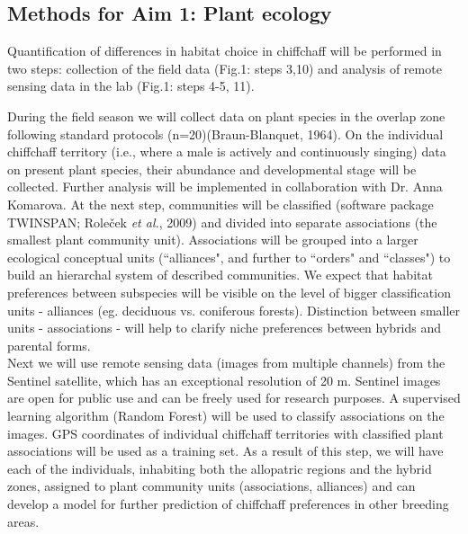\documentclass[11pt,a4paper]{article}
\begin{document}
\subsection{Methods for Aim 1: Plant ecology} 

Quantification of differences in habitat choice in chiffchaff will be performed in two steps: collection of the field data (Fig.1: steps 3,10) and analysis of remote sensing data in the lab (Fig.1: steps 4-5, 11).

During the field season we will collect data on plant species in the overlap zone following standard protocols (n=20)(Braun-Blanquet, 1964). On the individual chiffchaff territory (i.e., where a male is actively and continuously singing) data on present plant species, their abundance and developmental stage will be collected. Further analysis will be implemented in collaboration with Dr. Anna Komarova. At the next step, communities will be classified (software package TWINSPAN; Roleček \textit{et al.}, 2009) and divided into separate associations (the smallest plant community unit). Associations will be grouped into a larger ecological conceptual units (``alliances", and further to ``orders" and ``classes") to build an hierarchal system of described communities. We expect that habitat preferences between subspecies will be visible on the level of bigger classification units - alliances (eg. deciduous vs. coniferous forests). Distinction between smaller units - associations - will help to clarify niche preferences between hybrids and parental forms.\\

Next we will use remote sensing data (images from multiple channels) from the Sentinel satellite, which has an exceptional resolution of 20 m. Sentinel images are open for public use and can be freely used for research purposes. A supervised learning algorithm (Random Forest) will be used to classify associations on the images. GPS coordinates of individual chiffchaff territories with classified plant associations will be used as a training set. As a result of this step, we will have each of the individuals, inhabiting both the allopatric regions and the hybrid zones, assigned to plant community units (associations, alliances) and can develop a model for further prediction of chiffchaff preferences in other breeding areas.
\end{document}

